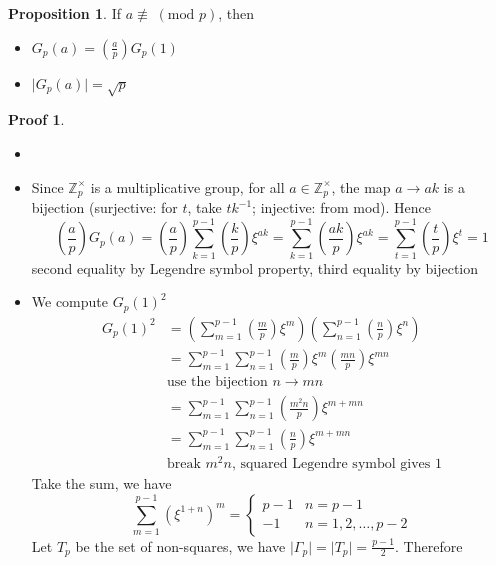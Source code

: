 \documentclass{book}
\newcommand{\Z}{\mathbb{Z}}
\newcommand{\abs}[1]{\lvert #1 \rvert }
\newcommand{\Mod}[1]{\;(\textrm{mod } #1 )}
\theoremstyle{definition}
\newtheorem{proposition}[lemma]{Proposition}
\theoremstyle{remarkstyle}
\newtheorem*{myproof}{Proof}%
\begin{document}
\begin{proposition}
    If $a\not\equiv \Mod{p}$, then 
    \begin{itemize}
        \item $G_p(a)=\left(\frac{a}{p}\right)G_p(1)$
        \item $\abs{G_p(a)}=\sqrt{p}$
    \end{itemize}
\end{proposition}
\begin{myproof}
    \begin{itemize}
        \item[]
        \item Since $\Z^\times_p$ is a multiplicative group, for all $a\in\Z^\times_p$, the map $a\rightarrow ak$ is a bijection (surjective: for $t$, take $tk^{-1}$; injective: from mod). Hence
        $$
        \left(\frac{a}{p}\right)G_p(a) = \left(\frac{a}{p}\right)\sum^{p-1}_{k=1}\left(\frac{k}{p}\right)\xi^{ak} = \sum^{p-1}_{k=1}\left(\frac{ak}{p}\right)\xi^{ak} = \sum^{p-1}_{t=1}\left(\frac{t}{p}\right)\xi^{t} = 1
        $$
        second equality by Legendre symbol property, third equality by bijection
        \item We compute $G_p(1)^2$
        \begin{align*}
            G_p(1)^2 &= \left(\sum^{p-1}_{m=1}\left(\frac{m}{p}\right)\xi^{m}\right)\left(\sum^{p-1}_{n=1}\left(\frac{n}{p}\right)\xi^{n}\right) \\
            &= \sum^{p-1}_{m=1}\sum^{p-1}_{n=1}\left(\frac{m}{p}\right)\xi^{m}\left(\frac{mn}{p}\right)\xi^{mn} \\
            &\textrm{use the bijection $n\rightarrow mn$} \\
            &= \sum^{p-1}_{m=1}\sum^{p-1}_{n=1}\left(\frac{m^2n}{p}\right)\xi^{m+mn} \\
            &= \sum^{p-1}_{m=1}\sum^{p-1}_{n=1}\left(\frac{n}{p}\right)\xi^{m+mn} \\
            &\textrm{break $m^2n$, squared Legendre symbol gives 1}
        \end{align*}
        Take the sum, we have 
        $$
        \sum^{p-1}_{m=1}(\xi^{1+n})^m = \left\{
        \begin{array}{ll}
            p-1 & n = p-1 \\
            -1 & n = 1,2,\dots,p-2
        \end{array}
        \right.
        $$
        Let $T_p$ be the set of non-squares, we have $\abs{\Gamma_p}=\abs{T_p}=\frac{p-1}{2}$. Therefore
        \begin{align*}

\end{align*}
\end{itemize}
\end{myproof}
\end{document}
